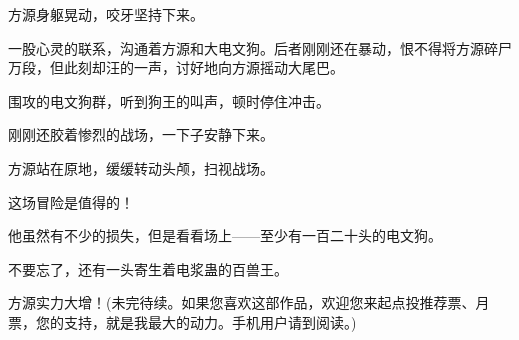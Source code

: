 \begin{this_body}
方源身躯晃动，咬牙坚持下来。

一股心灵的联系，沟通着方源和大电文狗。后者刚刚还在暴动，恨不得将方源碎尸万段，但此刻却汪的一声，讨好地向方源摇动大尾巴。

围攻的电文狗群，听到狗王的叫声，顿时停住冲击。

刚刚还胶着惨烈的战场，一下子安静下来。

方源站在原地，缓缓转动头颅，扫视战场。

这场冒险是值得的！

他虽然有不少的损失，但是看看场上——至少有一百二十头的电文狗。

不要忘了，还有一头寄生着电浆蛊的百兽王。

方源实力大增！(未完待续。如果您喜欢这部作品，欢迎您来起点投推荐票、月票，您的支持，就是我最大的动力。手机用户请到阅读。)

\end{this_body}

